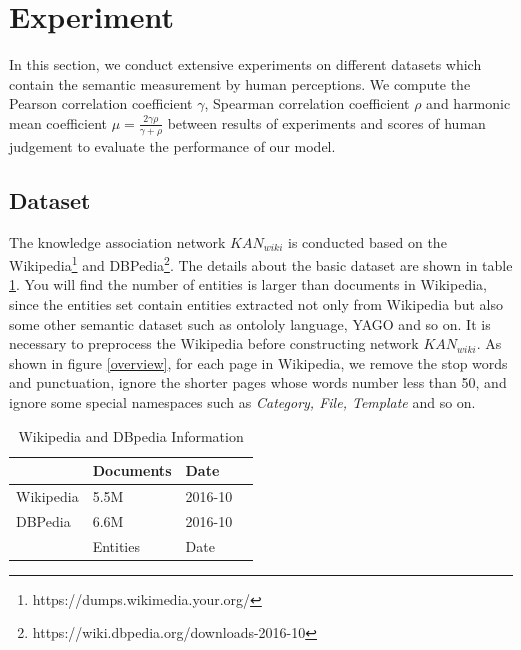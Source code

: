 \section{Experiment}
\label{experiment}
In this section, we conduct extensive experiments on different datasets which
contain the semantic measurement by human perceptions. We compute the Pearson
correlation coefficient $\gamma$, Spearman correlation coefficient $\rho$ and
harmonic mean coefficient $\mu=\frac{2\gamma\rho}{\gamma+\rho}$
between results of experiments and scores of human judgement to evaluate the performance of our model. 

\subsection{Dataset}
The knowledge association network $KAN_{wiki}$ is conducted based on the Wikipedia\footnote{https://dumps.wikimedia.your.org/}
and DBPedia\footnote{https://wiki.dbpedia.org/downloads-2016-10}. The details about the basic dataset are shown in table
\ref{basicdataset}. You will find the number of entities is larger than documents in Wikipedia, since the entities set
contain entities extracted not only from Wikipedia but also some other semantic dataset such as ontololy language, YAGO and
so on. It is necessary to preprocess the Wikipedia before constructing network $KAN_{wiki}$. As shown in figure \ref{overview},
for each page in Wikipedia, we remove the stop words and punctuation, ignore the shorter pages whose words number less than 50, and
ignore some special namespaces such as \emph{Category, File, Template} and so on.

\renewcommand\arraystretch{1.2}
\begin{table}[H]
    \center
    \begin{tabular}{|p{1.6cm}|p{1.6cm}|p{1.6cm}|p{1.6cm}|}
    \hline
              & Documents & Date        \\ \hline
    Wikipedia & 5.5M      & 2016-10     \\ \hline
    DBPedia   & 6.6M      & 2016-10     \\ \hline
              & Entities   & Date \\ \hline
    \end{tabular}
    \caption{Wikipedia and DBpedia Information}
    \label{basicdataset}
\end{table}

